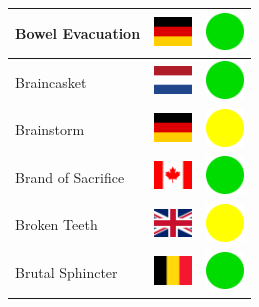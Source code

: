 \documentclass[12pt, a4paper, twoside]{report}
\begin{document}
\begin{center}
\begin{longtable}{|p{5cm}|p{2cm}|p{2cm}|}
Bowel Evacuation & \includegraphics[width=1cm]{4x3/de} & \includegraphics[width=1cm]{likes/y} \\ \hline
Braincasket & \includegraphics[width=1cm]{4x3/nl} & \includegraphics[width=1cm]{likes/y} \\ \hline
Brainstorm & \includegraphics[width=1cm]{4x3/de} & \includegraphics[width=1cm]{likes/m} \\ \hline
Brand of Sacrifice & \includegraphics[width=1cm]{4x3/ca} & \includegraphics[width=1cm]{likes/y} \\ \hline
Broken Teeth & \includegraphics[width=1cm]{4x3/gb} & \includegraphics[width=1cm]{likes/m} \\ \hline
Brutal Sphincter & \includegraphics[width=1cm]{4x3/be} & \includegraphics[width=1cm]{likes/y} \\ \hline

\end{longtable}
\end{center}
\end{document}
